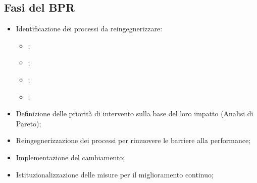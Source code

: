 \subsection{Fasi del BPR}\label{sub:fasi_del_bpr} %
\begin{itemize}
    \item Identificazione dei processi da reingegnerizzare:
        \begin{itemize}
            \item {};
            \item {};
            \item {};
            \item {};
        \end{itemize}
    \item Definizione delle priorità di intervento sulla base del loro impatto (Analisi di Pareto);
    \item Reingegnerizzazione dei processi per rimuovere le barriere alla performance;
    \item Implementazione del cambiamento;
    \item Istituzionalizzazione delle misure per il miglioramento continuo;
\end{itemize}
%

